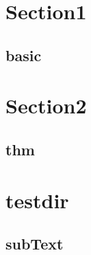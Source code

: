 \section{Section1}
    \subsection{basic}
        

\section{Section2}
    \subsection{thm}
        

\section{testdir}
    \subsection{subText}
        